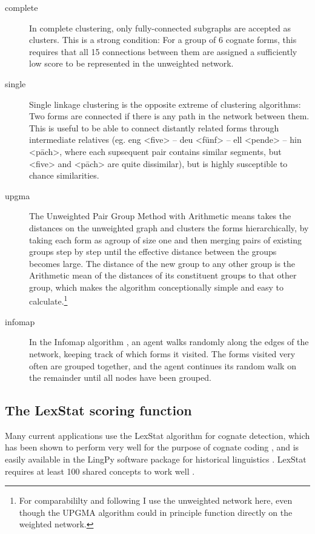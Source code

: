 \documentclass[a4paper,11pt,twocolumn]{scrartcl}
\begin{document}
\begin{description}
\item[complete] In complete clustering, only fully-connected subgraphs are
  accepted as clusters. This is a strong condition: For a group of 6 cognate
  forms, this requires that all 15 connections between them are assigned a
  sufficiently low score to be represented in the unweighted network.
\item[single] Single linkage clustering is the opposite extreme of clustering
  algorithms: Two forms are connected if there is any path in the network
  between them. This is useful to be able to connect distantly related forms
  through intermediate relatives (eg. eng <five> – deu <fünf> – ell <pende> –
  hin <pāch>, where each supsequent pair contains similar segments, but <five>
  and <pāch> are quite dissimilar), but is highly susceptible to chance
  similarities.
\item[upgma] The Unweighted Pair Group Method with Arithmetic means
  \parencite{upgma} takes the distances on the unweighted graph and clusters the
  forms hierarchically, by taking each form as agroup of size one and then
  merging pairs of existing groups step by step until the effective distance
  between the groups becomes large. The distance of the new group to any other
  group is the Arithmetic mean of the distances of its constituent groups to
  that other group, which makes the algorithm conceptionally simple and easy to
  calculate.\footnote{For comparabililty and following
    \citeauthor{list2017potential} I use the unweighted network here, even
    though the UPGMA algorithm could in principle function directly on the
    weighted network.}
\item[infomap] In the Infomap algorithm \parencite{rosvall2008maps}, an agent
  walks randomly along the edges of the network, keeping track of which forms it
  visited. The forms visited very often are grouped together, and the agent
  continues its random walk on the remainder until all nodes have been grouped.
\end{description}

\subsection{The LexStat scoring function}
\label{lexstat}
Many current applications use the LexStat algorithm \parencite{list2012lexstat}
for cognate detection, which has been shown to perform very well for the purpose
of cognate coding \parencite{list2017potential}, and is easily available in the
LingPy software package for historical linguistics \parencite{lingpy26}. LexStat
requires at least 100 shared concepts to work well
\parencite{list2014investigating}.
\end{document}
